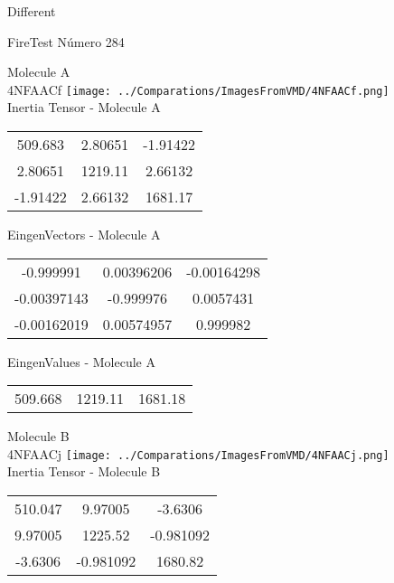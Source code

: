 \begin{center}
\vtab
\vtab
\textcolor{NavyBlue}{\Large Different}
\end{center}

 \newpage

\vtab[-2cm]
\begin{center}
{\large FireTest \tab Número 284}
\end{center}
\begin{multicols}{2}
\begin{center}

Molecule A \\ 
4NFAACf
\texttt{[image: ../Comparations/ImagesFromVMD/4NFAACf.png]}
\\
Inertia Tensor - Molecule A \\
\vtab

\begin{tabular}{|c c c|}
509.683	 & 	2.80651	 & 	-1.91422	 \\
2.80651	 & 	1219.11	 & 	2.66132	 \\
-1.91422	 & 	2.66132	 & 	1681.17
\end{tabular}

\vtab
 EingenVectors - Molecule A     \\
\vtab
\begin{tabular}{|c c c|}
-0.999991	 & 	0.00396206	 & 	-0.00164298	 \\
-0.00397143	 & 	-0.999976	 & 	0.0057431	 \\
-0.00162019	 & 	0.00574957	 & 	0.999982
\end{tabular}

\vtab
 EingenValues - Molecule A     \\
\vtab
\begin{tabular}{|c c c|}
509.668	 & 	1219.11	 & 	1681.18	 \\
\end{tabular}
\columnbreak

Molecule B \\ 
4NFAACj
\texttt{[image: ../Comparations/ImagesFromVMD/4NFAACj.png]}
\\
Inertia Tensor - Molecule B \\
\vtab

\begin{tabular}{|c c c|}
510.047	 & 	9.97005	 & 	-3.6306	 \\
9.97005	 & 	1225.52	 & 	-0.981092	 \\
-3.6306	 & 	-0.981092	 & 	1680.82
\end{tabular}


\end{center}
\end{multicols}

